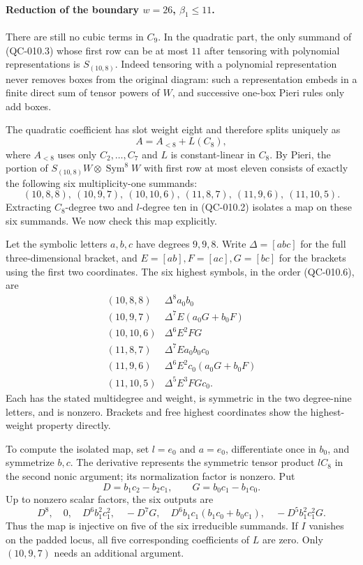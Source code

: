 \paragraph{Reduction of the boundary $w=26$, $\beta_1\leq11$.}
There are still no cubic terms in $C_9$. In the quadratic
part, the only summand of (QC-010.3) whose first row can
be at most $11$ after tensoring with polynomial
representations is $S_{(10,8)}$.
Indeed tensoring with a polynomial representation never
removes boxes from the original diagram: such a
representation embeds in a finite direct sum of tensor
powers of $W$, and successive one-box Pieri rules
only add boxes.

The quadratic coefficient has slot weight eight and
therefore splits uniquely as
\[
 A=A_{<8}+L(C_8),
\]
where $A_{<8}$ uses only $C_2,\ldots,C_7$ and $L$ is
constant-linear in $C_8$. By Pieri, the portion of
$S_{(10,8)}W\otimes\operatorname{Sym}^8W$ with first
row at most eleven consists of exactly the following
six multiplicity-one summands:
\[
 (10,8,8),\ (10,9,7),\ (10,10,6),\
 (11,8,7),\ (11,9,6),\ (11,10,5).
 \tag{QC-010.6}
\]
Extracting $C_8$-degree two and $l$-degree ten in
(QC-010.2) isolates a map on these six summands.
We now check this map explicitly.

Let the symbolic letters $a,b,c$ have degrees $9,9,8$.
Write $\Delta=[abc]$ for the full three-dimensional
bracket, and $E=[ab],F=[ac],G=[bc]$ for the brackets
using the first two coordinates. The six highest
symbols, in the order (QC-010.6), are
\[
\begin{array}{c|l}
(10,8,8)&\Delta^8a_0b_0\\
(10,9,7)&\Delta^7E(a_0G+b_0F)\\
(10,10,6)&\Delta^6E^2FG\\
(11,8,7)&\Delta^7Ea_0b_0c_0\\
(11,9,6)&\Delta^6E^2c_0(a_0G+b_0F)\\
(11,10,5)&\Delta^5E^3FGc_0.
\end{array}
\tag{QC-010.7}
\]
Each has the stated multidegree and weight, is symmetric
in the two degree-nine letters, and is nonzero. Brackets
and free highest coordinates show the highest-weight
property directly.

To compute the isolated map, set $l=e_0$ and $a=e_0$,
differentiate once in $b_0$, and symmetrize $b,c$.
The derivative represents the symmetric tensor product
$lC_8$ in the second nonic argument; its normalization
factor is nonzero. Put
\[
 D=b_1c_2-b_2c_1,\qquad G=b_0c_1-b_1c_0.
\]
Up to nonzero scalar factors, the six outputs are
\[
 D^8,\quad 0,\quad D^6b_1^2c_1^2,\quad -D^7G,\quad
 D^6b_1c_1(b_1c_0+b_0c_1),\quad -D^5b_1^2c_1^2G.
 \tag{QC-010.8}
\]
Thus the map is injective on five of the six irreducible
summands. If $I$ vanishes on the padded locus, all five
corresponding coefficients of $L$ are zero. Only
$(10,9,7)$ needs an additional argument.

